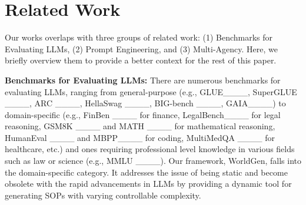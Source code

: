 \section{Related Work}
Our works overlaps with three groups of related work: (1) Benchmarks for Evaluating LLMs, (2) Prompt Engineering, and (3) Multi-Agency. Here, we briefly overview them to provide a better context for the rest of this paper. 

\textbf{Benchmarks for Evaluating LLMs:}  There are numerous benchmarks for evaluating LLMs, ranging from general-purpose (e.g., GLUE____, SuperGLUE ____, ARC ____, HellaSwag ____, BIG-bench ____, GAIA____) to domain-specific (e.g., FinBen ____ for finance, LegalBench____ for legal reasoning, GSM8K ____ and MATH ____ for mathematical reasoning, HumanEval ____ and MBPP____ for coding, MultiMedQA ____ for healthcare, etc.) and ones requiring professional level knowledge in various fields such as law or science (e.g., MMLU ____). Our framework, WorldGen, falls into the domain-specific category. It addresses the issue of being static and become obsolete with the rapid advancements in LLMs by providing a dynamic tool for generating SOPs with varying controllable complexity.

